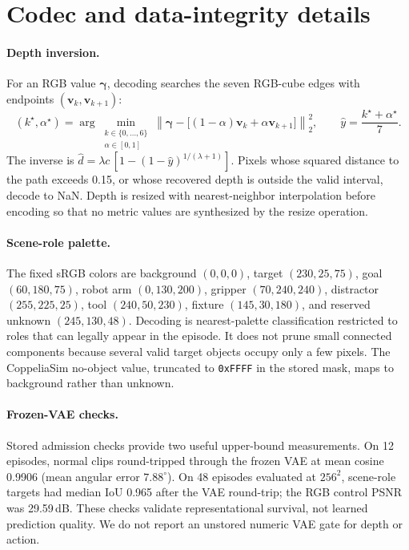 \documentclass{article}
\newcommand{\code}[1]{\texttt{#1}}
\begin{document}
\section{Codec and data-integrity details}
\label{app:codecs}

\paragraph{Depth inversion.}
For an RGB value $\boldsymbol\gamma$, decoding searches the seven RGB-cube edges with endpoints
$(\mathbf{v}_k,\mathbf{v}_{k+1})$:
\begin{equation}
 (k^\star,\alpha^\star)=
 \arg\min_{\substack{k\in\{0,\ldots,6\}\\\alpha\in[0,1]}}
 \left\|\boldsymbol\gamma-\big[(1-\alpha)\mathbf{v}_k+
 \alpha\mathbf{v}_{k+1}\big]\right\|_2^2,
 \qquad \hat y=\frac{k^\star+\alpha^\star}{7}.
\label{eq:depthdecode}
\end{equation}
The inverse is
$\hat d=\lambda c\,[1-(1-\hat y)^{1/(\lambda+1)}]$.
Pixels whose squared distance to the path exceeds 0.15, or whose recovered depth is outside the
valid interval, decode to NaN. Depth is resized with nearest-neighbor interpolation before
encoding so that no metric values are synthesized by the resize operation.

\paragraph{Scene-role palette.}
The fixed sRGB colors are background $(0,0,0)$, target $(230,25,75)$, goal $(60,180,75)$,
robot arm $(0,130,200)$, gripper $(70,240,240)$, distractor $(255,225,25)$, tool
$(240,50,230)$, fixture $(145,30,180)$, and reserved unknown $(245,130,48)$. Decoding is
nearest-palette classification restricted to roles that can legally appear in the episode. It
does not prune small connected components because several valid target objects occupy only a few
pixels. The CoppeliaSim no-object value, truncated to \code{0xFFFF} in the stored mask, maps to
background rather than unknown.

\paragraph{Frozen-VAE checks.}
Stored admission checks provide two useful upper-bound measurements. On 12 episodes, normal clips
round-tripped through the frozen VAE at mean cosine 0.9906 (mean angular error
$7.88^\circ$). On 48 episodes evaluated at $256^2$, scene-role targets had median IoU 0.965 after
the VAE round-trip; the RGB control PSNR was 29.59\,dB. These checks validate representational
survival, not learned prediction quality. We do not report an unstored numeric VAE gate for depth
or action.
\end{document}

